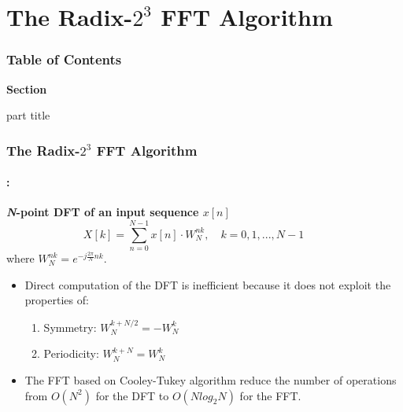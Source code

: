 \section{The Radix-$2^3$ FFT  Algorithm}
\begin{frame}
  \frametitle{\textbf{Table of Contents}}
  \begin{center}
    {\vspace{-1.5cm}\Large \textbf{Section \thesection}\vspace{0.5cm}}
    \begin{beamercolorbox}[
      sep=8pt,center]{part title}
      \textbf{\insertsection}
    \end{beamercolorbox}
  \end{center}
\end{frame}

\begin{frame}
	\frametitle{\textbf{The Radix-$2^3$ FFT  Algorithm}}
	\framesubtitle{\secname : \subsecname}
	\begin{block}{\centering \textbf{\textit{N}-point DFT of an input sequence $x[n]$}}
		\begin{equation}
			X[k] = \sum_{n=0}^{N-1} x[n] \cdot W_N^{nk}, \quad k=0,1,...,N-1 \qquad
		\end{equation}
		where $W_N^{nk} = e^{-j\frac{2\pi}{N} nk}$. 
	\end{block}
	
	\begin{block}{\centering}
		\begin{itemize}\justifying\footnotesize
			\item Direct computation of the DFT is inefficient because it does not exploit the properties of:
			\begin{enumerate}
				\item Symmetry: $ W_N^{k+N/2} = -W_N^k$
				\item Periodicity:  $W_N^{k+N} = W_N^k$
			\end{enumerate}
			\item The FFT based on Cooley-Tukey algorithm reduce the number of operations from $O(N^2)$ for the DFT to $O(Nlog_2N)$ for the FFT.
		\end{itemize}	
	\end{block}
\end{frame}


